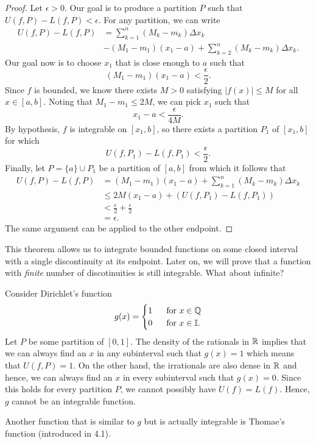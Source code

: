\begin{proof}
Let \( \epsilon > 0  \). Our goal is to produce a partition \( P  \) such that \( U(f, P ) - L(f, P ) < \epsilon. \) For any partition, we can write 
\begin{align*}
    U(f, P ) - L(f,P ) &= \sum_{ k=1 }^{ n } (M_{k } - m_{k } ) \Delta x_{ k } \\
					   &- (M_{1} - m_{1})(x_{1} - a) + \sum_{ k=2 }^{ n } (M_{k} - m_{ k }) \Delta x_{k }.
\end{align*}
Our goal now is to choose \( x_{1} \) that is close enough to \( a \) such that 
\[  (M_{1} - m_{1})(x_{1} - a ) < \frac{ \epsilon  }{ 2 }. \] Since \( f  \) is bounded, we know there exists \( M > 0  \) satisfying \( | f(x)  | \leq M  \) for all \( x \in [a,b]  \). Noting that \( M_{1} - m_{1} \leq 2M \), we can pick \( x_{1} \) such that 
\[  x_{1} - a < \frac{ \epsilon  }{ 4 M  }. \] By hypothesis, \( f  \) is integrable on \( [x_{1}, b ] \), so there exists a partition \( P_{1}  \) of \( [x_{1}, b] \) for which 
\[  U(f, P_{1}) - L(f, P_{1}) < \frac{ \epsilon  }{ 2 }. \] Finally, let \( P = \{ a \} \cup P_{1} \) be a partition of \(  [a,b]  \) from which it follows that 
\begin{align*}
    U(f,P) - L(f,P) &= (M_{1} - m_{1})(x_{1} - a ) + \sum_{ k=1 }^{ n } (M_{k } - m_{k }) \Delta x_{k } \\
					&\leq 2M ( x_{1} - a ) + (U(f, P_{1}) - L(f,P_{1})) \\
					&< \frac{ \epsilon  }{ 2 }  + \frac{ \epsilon  }{ 2  } \\
					&= \epsilon.
\end{align*}
The same argument can be applied to the other endpoint.
\end{proof}

This theorem allows us to integrate bounded functions on some closed interval with a single discontinuity at its endpoint. Later on, we will prove that a function with \textit{finite} number of discotinuities is still integrable. What about infinite? 

Consider Dirichlet's function 
\[  g(x) = 
\begin{cases}
	1 \ &\text{ for } x \in \mathbb{Q} \\
	0 \ &\text{ for } x \in \mathbb{I}.
\end{cases}  \]
Let \( P  \) be some partition of \( [0,1]  \). The density of the rationals in \( \mathbb{R}  \) implies that we can always find an \( x   \) in any subinterval such that \( g(x) = 1  \) which means that \( U(f,P) = 1  \). On the other hand, the irrationals are also dense in \( \mathbb{R}  \) and hence, we can always find an \( x  \) in every subinterval such that \( g(x) = 0  \). Since this holds for every partition \( P  \), we cannot possibly have \( U(f) = L(f)   \). Hence, \( g  \) cannot be an integrable function.

Another function that is similar to \( g  \) but is actually integrable is Thomae's function (introduced in 4.1).  


